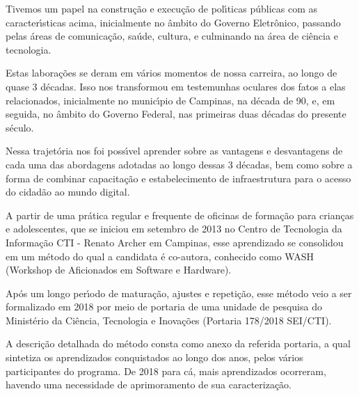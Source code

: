 \documentclass[
12pt,		%
openright,	%
twoside,  %
a4paper,			%
chapter=TITLE,		%
english,			%
french,				%
spanish,			%
brazil				%
]{USPSC-classe/USPSC}
\begin{document}
Tivemos um papel na constru\c{c}\~ao e execu\c{c}\~ao de pol\'{\i}ticas p\'ublicas com as caracter\'{\i}sticas acima, inicialmente no \^ambito do Governo Eletr\^onico, passando pelas \'areas de comunica\c{c}\~ao, sa\'ude, cultura, e culminando na \'area de ci\^encia e tecnologia.









Estas labora\c{c}\~oes  se deram em v\'arios momentos de nossa carreira, ao longo de quase 3 d\'ecadas. Isso nos transformou em testemunhas oculares dos fatos a elas relacionados, inicialmente no  munic\'{\i}pio de Campinas, na d\'ecada de 90, e, em seguida, no \^ambito do Governo Federal, nas primeiras duas d\'ecadas do presente s\'eculo.









Nessa trajet\'oria nos foi poss\'{\i}vel aprender sobre as vantagens e desvantagens de cada uma das abordagens adotadas ao longo dessas 3 d\'ecadas, bem como sobre a forma de combinar capacita\c{c}\~ao e estabelecimento de infraestrutura para o acesso do cidad\~ao ao mundo digital.









A partir de uma pr\'atica regular e frequente de oficinas de forma\c{c}\~ao para  crian\c{c}as e adolescentes, que se iniciou em setembro de 2013 no Centro de Tecnologia da Informa\c{c}\~ao CTI - Renato Archer em Campinas, esse aprendizado se consolidou em um m\'etodo do qual a candidata \'e co-autora, conhecido como WASH (Workshop de Aficionados em Software e Hardware).









Ap\'os um longo per\'{\i}odo de matura\c{c}\~ao, ajustes e repeti\c{c}\~ao, esse m\'etodo veio a ser formalizado em 2018 por meio de portaria de uma unidade de pesquisa do Minist\'erio da Ci\^encia, Tecnologia e Inova\c{c}\~oes (Portaria 178/2018 SEI/CTI).









A descri\c{c}\~ao detalhada do m\'etodo consta como anexo da referida portaria, a qual sintetiza os aprendizados conquistados ao longo dos anos, pelos v\'arios participantes do programa. De 2018 para c\'a, mais aprendizados ocorreram, havendo uma necessidade de aprimoramento de sua caracteriza\c{c}\~ao.
\end{document}
